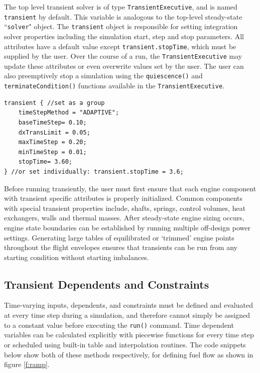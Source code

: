 \documentclass[heading.tex]{subfiles}
\begin{document}
The top level transient solver is of type \texttt{TransientExecutive}, and is named
\texttt{transient} by default. This variable is analogous to the top-level steady-state 
``\texttt{solver}" object. The \texttt{transient} object is responsible for setting integration
solver properties including the simulation start, step and stop parameters. \cite[chap.~7.5]{NPSS}
\cite[chap.~15.1.8]{NPSS}  All attributes have a default value except \texttt{transient.stopTime},
which must be supplied by the user. Over the course of a run, the \texttt{TransientExecutive} may
update these attributes or even overwrite values set by the user. The user can also preemptively
stop a simulation using the  \texttt{quiescence()} and  \texttt{terminateCondition()} functions
available in the \texttt{TransientExecutive}.

\begin{adjustwidth}{0cm}{0cm}
 \begin{verbatim}
transient { //set as a group
	timeStepMethod = "ADAPTIVE";
	baseTimeStep= 0.10;
	dxTransLimit = 0.05;
	maxTimeStep = 0.20;
	minTimeStep = 0.01;
	stopTime= 3.60;
} //or set individually: transient.stopTime = 3.6;
 \end{verbatim}
 \end{adjustwidth} 

Before running transiently, the user must first ensure that each engine component with transient
specific attributes is properly initialized. Common components with special transient properties
include, shafts, springs, control volumes, heat exchangers, walls and thermal masses.
After steady-state engine sizing occurs, engine state boundaries can be established by running multiple
off-design power settings. Generating large tables of equilibrated or `trimmed' engine points
throughout the flight envelopes ensures that transients can be run from any starting condition without
starting imbalances.

\subsection{Transient Dependents and Constraints}

Time-varying inputs, dependents, and constraints must be defined and evaluated at every time step during a simulation, and therefore cannot simply be
assigned to a constant value before executing the \texttt{run()} command. Time dependent variables can be calculated explicitly with
piecewise functions for every time step or scheduled using built-in table and interpolation routines.
The code snippets below show both of these methods respectively, for defining fuel flow as shown in figure \ref{f:ramp}.
\end{document}
